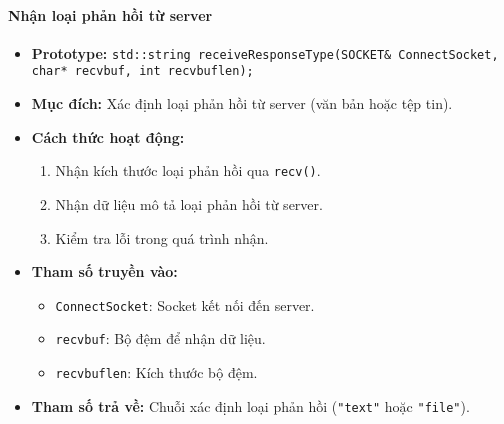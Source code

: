 \paragraph{\textbf{Nhận loại phản hồi từ server}}
\begin{itemize}
    \item \textbf{Prototype:} \texttt{std::string receiveResponseType(SOCKET\& ConnectSocket, char* recvbuf, int recvbuflen);}
    
    \item \textbf{Mục đích:} Xác định loại phản hồi từ server (văn bản hoặc tệp tin).
    
    \item \textbf{Cách thức hoạt động:} 
    \begin{enumerate}
        \item Nhận kích thước loại phản hồi qua \texttt{recv()}.
        \item Nhận dữ liệu mô tả loại phản hồi từ server.
        \item Kiểm tra lỗi trong quá trình nhận.
    \end{enumerate}
    
    \item \textbf{Tham số truyền vào:} 
    \begin{itemize}
        \item \texttt{ConnectSocket}: Socket kết nối đến server.
        \item \texttt{recvbuf}: Bộ đệm để nhận dữ liệu.
        \item \texttt{recvbuflen}: Kích thước bộ đệm.
    \end{itemize}
    
    \item \textbf{Tham số trả về:} Chuỗi xác định loại phản hồi (\texttt{"text"} hoặc \texttt{"file"}).
\end{itemize}


